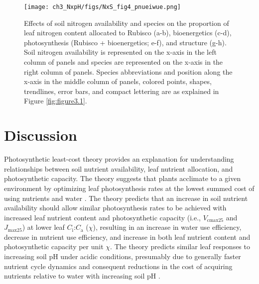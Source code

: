     \newpage
    \begin{figure}
        \texttt{[image: ch3\_NxpH/figs/NxS\_fig4\_pnueiwue.png]}
        \centering
        \caption[Effects of soil N availability, species, and leaf N content on tradeoffs between nitrogen and water use]{Effects of soil nitrogen availability and species on the proportion of leaf nitrogen content allocated to Rubisco (a-b), bioenergetics (c-d), photosynthesis (Rubisco + bioenergetics; e-f), and structure (g-h). Soil nitrogen availability is represented on the x-axis in the left column of panels and species are represented on the x-axis in the right column of panels. Species abbreviations and position along the x-axis in the middle column of panels, colored points, shapes, trendlines, error bars, and compact lettering are as explained in Figure \ref{fig:figure3.1}.}
        \label{fig:figure3.4}
    \end{figure}
    \clearpage

    \section{Discussion}
    Photosynthetic least-cost theory provides an explanation for understanding relationships between soil nutrient availability, leaf nutrient allocation, and photosynthetic capacity. The theory suggests that plants acclimate to a given environment by optimizing leaf photosynthesis rates at the lowest summed cost of using nutrients and water . The theory predicts that an increase in soil nutrient availability should allow similar photosynthesis rates to be achieved with increased leaf nutrient content and photosynthetic capacity (i.e., $V_\mathrm{cmax25}$ and $J_\mathrm{max25}$) at lower leaf $C_\mathrm{i}$:$C_\mathrm{a}$ ($\chi$), resulting in an increase in water use efficiency, decrease in nutrient use efficiency, and increase in both leaf nutrient content and photosynthetic capacity per unit $\chi$. The theory predicts similar leaf responses to increasing soil pH under acidic conditions, presumably due to generally faster nutrient cycle dynamics and consequent reductions in the cost of acquiring nutrients relative to water with increasing soil pH .
    
